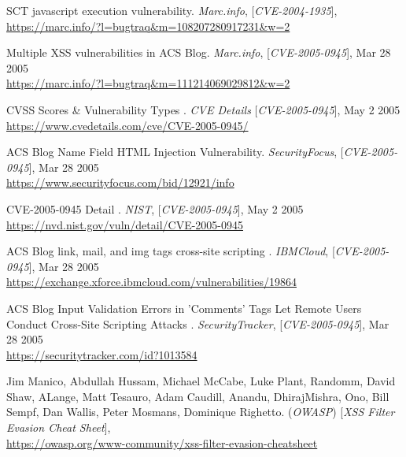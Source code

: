 \begin{thebibliography}{9}
SCT javascript execution vulnerability. \textit{Marc.info}, [\textit{CVE-2004-1935}],  \\ \url{https://marc.info/?l=bugtraq&m=108207280917231&w=2}


Multiple XSS vulnerabilities in ACS Blog. \textit{Marc.info}, [\textit{CVE-2005-0945}],  Mar 28 2005 \\ \url{https://marc.info/?l=bugtraq&m=111214069029812&w=2}

CVSS Scores \& Vulnerability Types . \textit{CVE Details} [\textit{CVE-2005-0945}], May 2 2005   \\ \url{https://www.cvedetails.com/cve/CVE-2005-0945/}

 ACS Blog Name Field HTML Injection Vulnerability. \textit{SecurityFocus}, [\textit{CVE-2005-0945}], Mar 28 2005  \\ \url{https://www.securityfocus.com/bid/12921/info}
 
 CVE-2005-0945 Detail . \textit{NIST}, [\textit{CVE-2005-0945}], May 2 2005 \\ \url{https://nvd.nist.gov/vuln/detail/CVE-2005-0945}

 ACS Blog link, mail, and img tags cross-site scripting . \textit{IBMCloud}, [\textit{CVE-2005-0945}],  Mar 28 2005 \\ \url{https://exchange.xforce.ibmcloud.com/vulnerabilities/19864}

 ACS Blog Input Validation Errors in 'Comments' Tags Let Remote Users Conduct Cross-Site Scripting Attacks . \textit{SecurityTracker}, [\textit{CVE-2005-0945}],  Mar 28 2005  \\ \url{https://securitytracker.com/id?1013584}




Jim Manico, Abdullah Hussam, Michael McCabe, Luke Plant, Randomm, David Shaw, ALange, Matt Tesauro, Adam Caudill, Anandu, DhirajMishra, Ono, Bill Sempf, Dan Wallis, Peter Mosmans, Dominique Righetto. (\textit{OWASP}) [\textit{XSS Filter Evasion Cheat Sheet}],\\ \url{https://owasp.org/www-community/xss-filter-evasion-cheatsheet}{\color{black}}


\end{thebibliography}
